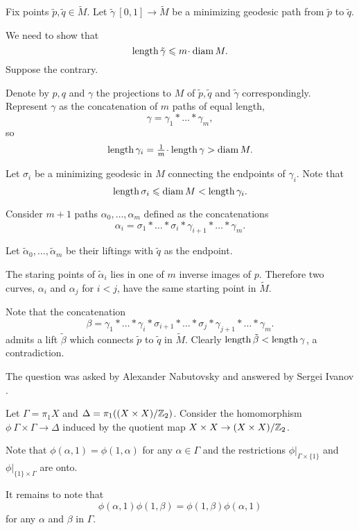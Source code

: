Fix points $\tilde p,\tilde q\in\tilde M$.
Let  
$\tilde\gamma\:[0,1]\to \tilde M$ be a minimizing geodesic path from $\tilde p$ to $\tilde q$. 

We need to show that 
\[\length \tilde\gamma\le m\cdot \diam M.\]
Suppose the contrary.

Denote by $p,q$ and $\gamma$ the projections to $M$ of $\tilde p,\tilde q$ and $\tilde \gamma$ correspondingly. 
Represent $\gamma$
as the concatenation of $m$ paths of equal length,
\[\gamma=\gamma_1{*}\dots{*}\gamma_m,\] 
so
\[\length\gamma_i=\tfrac{1}m\cdot\length\gamma>\diam M.\] 

Let $\sigma_i$ be a minimizing geodesic in $M$ connecting the endpoints of $\gamma_i$. 
Note that 
\[\operatorname{\rm length}\sigma_i\leqslant \operatorname{\rm diam}\nolimits M< \operatorname{\rm length}\gamma_i.\] 

Consider $m+1$ paths $\alpha_0,\dots,\alpha_m$ defined as the concatenations 
\[\alpha_i=\sigma_1{*}\dots{*}\sigma_i{*}\gamma_{i+1}{*}\dots{*}\gamma_m.\]

Let $\tilde\alpha_0,\dots,\tilde\alpha_m$ be their liftings
with $\tilde q$ as the endpoint.

The staring points of $\tilde\alpha_i$ lies in one of $m$ inverse images of $p$. 
Therefore two curves, $\alpha_i$ and $\alpha_j$ for $i<j$, 
have the same starting point in $\tilde M$.

Note that the concatenation
\[\beta=\gamma_1{*}\dots{*}\gamma_i{*}\sigma_{i+1}{*}\dots{*}\sigma_j{*}\gamma_{j+1}{*}\dots{*}\gamma_m.\]
admits a lift $\tilde\beta$ 
which connects $\tilde p$ to $\tilde q$ in $\tilde M$.
Clearly $\operatorname{\rm length} \tilde\beta<\operatorname{\rm length} \gamma$, a contradiction.
\qeds

The question was asked by Alexander  Nabutovsky
and answered by Sergei Ivanov \cite[see][]{ivanov}.



Let $\Gamma=\pi_1 X$ and $\Delta=\pi_1((X\times X)/\mathbb{Z}_2)$.
Consider the homomorphism $\phi\:\Gamma\times \Gamma\to \Delta$
induced by the quotient map $X\times X\to (X\times X)/\mathbb{Z}_2$.

Note that $\phi(\alpha,1)=\phi(1,\alpha)$ for any $\alpha\in \Gamma$ and the restrictions $\phi|_{\Gamma\times \{1\}}$ and $\phi|_{\{1\}\times\Gamma}$
are onto.

It remains to note that 
$$\phi(\alpha,1)\phi(1,\beta)=\phi(1,\beta)\phi(\alpha,1)$$
for any $\alpha$ and $\beta$ in $\Gamma$.
\qeds

